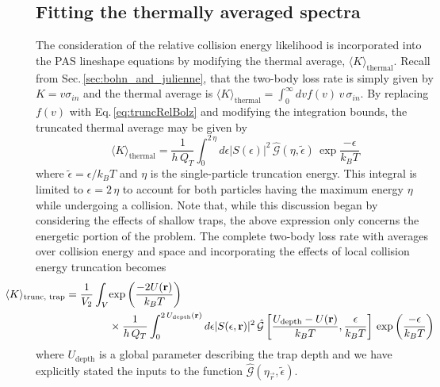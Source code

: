 \subsection{Fitting the thermally averaged spectra} \label{sec:lowIntSpectra}
The consideration of the relative collision energy likelihood is incorporated into the PAS lineshape equations by modifying the thermal average, $\langle K \rangle_\text{thermal}$.
Recall from Sec.\,\ref{sec:bohn_and_julienne}, that the two-body loss rate is simply given by $K= v \sigma_{in}$ and the thermal average is $\langle K \rangle_{\text{thermal}} = \int_0^{\infty} dv f(v)\,v\,\sigma_{in}$.
By replacing $f(v)$ with Eq.\,\ref{eq:truncRelBolz} and modifying the integration bounds, the truncated thermal average may be given by
\begin{equation}
	\langle K \rangle_\text{thermal} = \frac{1}{h\,Q_{T}} \int_{0}^{2\,\eta} d\epsilon \vert S(\epsilon) \vert^2 \, \hat{\mathcal{G}}(\eta, \tilde{\epsilon})\,\exp{\frac{-\epsilon}{k_{B}T}}
\end{equation}
where $\tilde{\epsilon} = \epsilon/k_{B}T$ and $\eta$ is the single-particle truncation energy.
This integral is limited to $\epsilon = 2\,\eta$ to account for both particles having the maximum energy $\eta$ while undergoing a collision.
Note that, while this discussion began by considering the effects of shallow traps, the above expression only concerns the energetic portion of the problem.
The complete two-body loss rate with averages over collision energy and space and incorporating the effects of local collision energy truncation becomes
\begin{align} \label{eq:chap5avgTruncK}
\hspace*{-1cm} 
	\langle K \rangle_\text{trunc, trap} = \frac{1}{V_2} \int_V &\exp{\frac{-2 U(\vec{r})}{k_{B}T}} \\ 
	\nonumber
	&\times \frac{1}{h\,Q_{T}} \int_{0}^{2\,U_{\text{depth}}(\vec{r})} d\epsilon \vert S(\epsilon, \vec{r}) \vert^2 \,\hat{\mathcal{G}} \left[\frac{U_\text{depth}-U(\vec{r})}{k_B T}, \frac{\epsilon}{k_{B}T}  \right]  \,\exp{\frac{-\epsilon}{k_{B}T}}
\end{align}
where $U_\text{depth}$ is a global parameter describing the trap depth and we have explicitly stated the inputs to the function $\hat{\mathcal{G}}(\eta_{\vec{r}}, \tilde{\epsilon})$.

